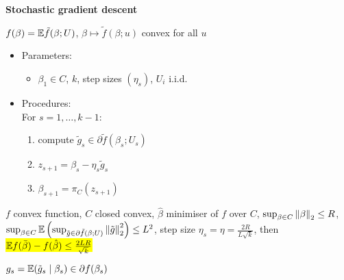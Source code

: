 \textbf{Stochastic gradient descent}
\begin{setting}
    $f(\beta) = \mathbb{E} \tilde f(\beta;U)$, $\beta \mapsto \tilde f(\beta; u)$ convex for all $u$
\end{setting}

\begin{itemize}
    \item Parameters:
    \begin{itemize}
        \item $\beta_1 \in C$, $k$, step sizes $(\eta_s)$, $U_i$ i.i.d.\
    \end{itemize}
    \item Procedures:\\
    For $s = 1, \dots, k - 1$:
    \begin{enumerate}
        \item compute $\tilde g_s \in \partial \tilde f(\beta_s; U_s)$
        \item $z_{s+1} = \beta_s - \eta_s \tilde g_s$
        \item $\beta_{s+1} = \pi_C(z_{s+1})$
    \end{enumerate}
\end{itemize}

\begin{thm}
     $f$ convex function, $C$ closed convex, $\hat \beta$ minimiser of $f$ over $C$, $\sup_{\beta \in C} \left\lVert\beta\right\rVert_2 \leq R$,
    $\sup_{\beta \in C} \mathbb{E} \left( \sup_{\tilde g \in \partial \tilde f(\beta;U)}  \left\lVert\tilde g\right\rVert_2^2 \right)\leq L^2$, step size $\eta_s = \eta = \frac{2R}{L\sqrt{k}}$,
    then \hl{$\mathbb{E} f(\bar \beta) - f(\hat \beta) \leq \frac{2LR}{\sqrt{k}}$}
\end{thm}
\begin{pf}
    $g_s = \mathbb{E}(\tilde g_s \mid \beta_s) \in \partial f(\beta_s)$
\end{pf}